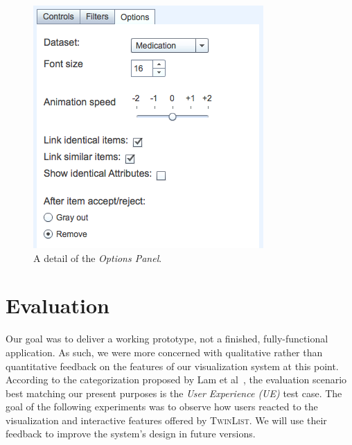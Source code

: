\documentclass{chi2009}
\newcommand{\TwinList}{\textsc{TwinList}}
\newcommand{\Options}{\textit{Options Panel}}
\begin{document}
\begin{figure}[t]
\begin{center}
\includegraphics[width=1\linewidth]{img/options2.png}
\end{center}
   \caption{A detail of the \Options.}
   \label{fig:options}
\end{figure}

\section{Evaluation}
Our goal was to deliver a working prototype, not a finished, fully-functional application. As such, we were more concerned with qualitative rather than quantitative feedback on the features of our visualization system at this point. According to the categorization proposed by Lam et al~\cite{lam-bertini-isenberg-plaisant-carpendale-2011}, the evaluation scenario best matching our present purposes is the \textit{User Experience (UE)} test case. The goal of the following experiments was to observe how users reacted to the visualization and interactive features offered by \TwinList. We will use their feedback to improve the system's design in future versions.
\end{document}
